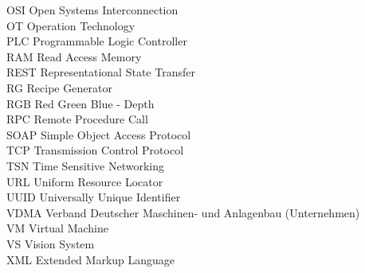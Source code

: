 \begin{tabbing}
OSI     \>  Open Systems Interconnection\\
OT  \> Operation Technology\\
PLC  \> Programmable Logic Controller\\
RAM    \> Read Access Memory \\
REST    \> Representational State Transfer \\
RG    \> Recipe Generator \\
RGB    \> Red Green Blue - Depth \\
RPC    \> Remote Procedure Call \\
SOAP	 \> 	Simple Object Access Protocol	 \\
TCP	 \> 	Transmission Control Protocol	 \\
TSN	 \> 	Time Sensitive Networking	 \\
URL	 \> 	Uniform Resource Locator	 \\
UUID	 \> 	Universally Unique Identifier	 \\
VDMA \>     Verband Deutscher Maschinen- und Anlagenbau (Unternehmen) \\
VM	 \> 	Virtual Machine	 \\
VS  \>  Vision System\\
XML  \>  Extended Markup Language\\
\end{tabbing}
\thispagestyle{empty}
\endinput

